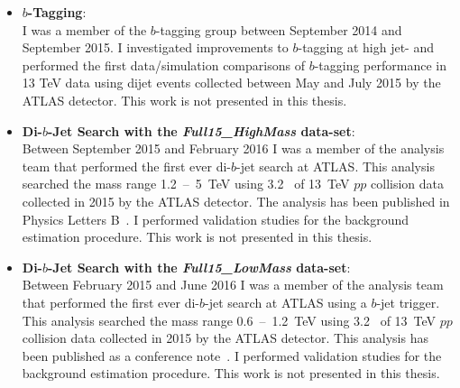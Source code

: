 \begin{itemize}[leftmargin=*]
\item\textbf{$b$-Tagging}:\\
  I was a member of the $b$-tagging group between September 2014 and September 2015.
  I investigated improvements to $b$-tagging at high jet-\pT{} and
  performed the first data/simulation comparisons of $b$-tagging performance in 13 TeV data using dijet events collected between May and July 2015 by the ATLAS detector. 
  This work is not presented in this thesis.\vspace{1em}
\item\textbf{Di-$b$-Jet Search with the \textit{Full15\_HighMass} data-set}:\\
  Between September 2015 and February 2016 I was a member of the analysis team that performed the first ever di-$b$-jet search at ATLAS.
  This analysis searched the mass range 1.2~--~5~TeV using 3.2~\ifb{} of 13~TeV $pp$ collision data collected in 2015 by the ATLAS detector.
  The analysis has been published in Physics Letters B~\cite{dibjet-mori16_paper}. 
  I performed validation studies for the background estimation procedure. 
  This work is not presented in this thesis.\vspace{1em}
\item\textbf{Di-$b$-Jet Search with the \textit{Full15\_LowMass} data-set}:\\
  Between February 2015 and June 2016 I was a member of the analysis team that performed the first ever di-$b$-jet search at ATLAS using a $b$-jet trigger.
  This analysis searched the mass range 0.6~--~1.2~TeV using 3.2~\ifb{} of 13~TeV $pp$ collision data collected in 2015 by the ATLAS detector.
  This analysis has been published as a conference note~\cite{dibjet-lhcp_conf}.
  I performed validation studies for the background estimation procedure.
  This work is not presented in this thesis.\vspace{1em}


\end{itemize}
